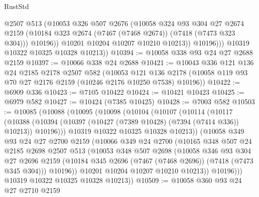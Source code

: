 \begin{lexlean}{RustStd}
\begin{coremodule}
                  @2507
                  @513
                  (@10053
                    @326
                    @507
                    @2676
                    (@10058
                      @324
                      @93
                      @304
                      @27
                      @2674
                      @2159
                      (@10184 @323 @2674 (@7467 (@7468 @2674)) (@7418 (@7473 @323 @304)))
                      @10196))
                  @10201
                  @10204
                  @10207
                  @10210
                  @10213))
              @10196)))
        @10319
        @10322
        @10325
        @10328
        @10213))
@10394 := @10058 @338 @93 @24 @27 @2688 @2159
@10397 := @10066 @338 @24 @2688
@10421 := @10043
    @336
    @121
    @136
    @24
    @2185
    @2178
    @2507
    @582
    (@10053
      @121
      @136
      @2178
      (@10058 @119 @93 @70 @27 @2176 @2159 (@10246 @2176 @10250 @7538) @10196))
@10422 := @6909 @336
@10423 := @7105 @10422
@10424 := @10421 @10423
@10425 := @6979 @582
@10427 := @10424 (@7385 @10425)
@10428 := @7003 @582
@10503 := @10085
    (@10088
      (@10095
        (@10098
          (@10104
            (@10107
              (@10114
                (@10117
                  (@10388
                    (@10394 (@10397 (@10427 (@7389 @10428) (@7394 (@7414 @336)) @10213)) @10196)))
                @10319
                @10322
                @10325
                @10328
                @10213))
            (@10058
              @349
              @93
              @24
              @27
              @2700
              @2159
              (@10066
                @349
                @24
                @2700
                (@10165
                  @348
                  @507
                  @24
                  @2185
                  @2698
                  @2507
                  @513
                  (@10053
                    @348
                    @507
                    @2698
                    (@10058
                      @346
                      @93
                      @304
                      @27
                      @2696
                      @2159
                      (@10184 @345 @2696 (@7467 (@7468 @2696)) (@7418 (@7473 @345 @304)))
                      @10196))
                  @10201
                  @10204
                  @10207
                  @10210
                  @10213))
              @10196)))
        @10319
        @10322
        @10325
        @10328
        @10213))
@10509 := @10058 @360 @93 @24 @27 @2710 @2159

\end{coremodule}
\end{lexlean}
